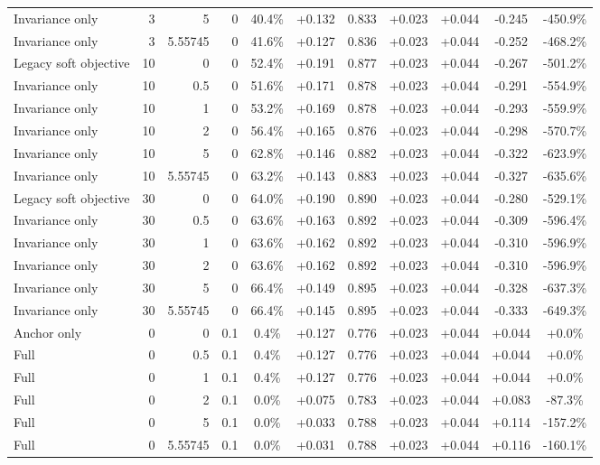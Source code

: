 \begin{table}[htbp]
\begin{tabular}{lrrrccccccc}
Invariance only & 3 & 5 & 0 & 40.4\% & +0.132 & 0.833 & +0.023 & +0.044 & -0.245 & -450.9\% \\
Invariance only & 3 & 5.55745 & 0 & 41.6\% & +0.127 & 0.836 & +0.023 & +0.044 & -0.252 & -468.2\% \\
Legacy soft objective & 10 & 0 & 0 & 52.4\% & +0.191 & 0.877 & +0.023 & +0.044 & -0.267 & -501.2\% \\
Invariance only & 10 & 0.5 & 0 & 51.6\% & +0.171 & 0.878 & +0.023 & +0.044 & -0.291 & -554.9\% \\
Invariance only & 10 & 1 & 0 & 53.2\% & +0.169 & 0.878 & +0.023 & +0.044 & -0.293 & -559.9\% \\
Invariance only & 10 & 2 & 0 & 56.4\% & +0.165 & 0.876 & +0.023 & +0.044 & -0.298 & -570.7\% \\
Invariance only & 10 & 5 & 0 & 62.8\% & +0.146 & 0.882 & +0.023 & +0.044 & -0.322 & -623.9\% \\
Invariance only & 10 & 5.55745 & 0 & 63.2\% & +0.143 & 0.883 & +0.023 & +0.044 & -0.327 & -635.6\% \\
Legacy soft objective & 30 & 0 & 0 & 64.0\% & +0.190 & 0.890 & +0.023 & +0.044 & -0.280 & -529.1\% \\
Invariance only & 30 & 0.5 & 0 & 63.6\% & +0.163 & 0.892 & +0.023 & +0.044 & -0.309 & -596.4\% \\
Invariance only & 30 & 1 & 0 & 63.6\% & +0.162 & 0.892 & +0.023 & +0.044 & -0.310 & -596.9\% \\
Invariance only & 30 & 2 & 0 & 63.6\% & +0.162 & 0.892 & +0.023 & +0.044 & -0.310 & -596.9\% \\
Invariance only & 30 & 5 & 0 & 66.4\% & +0.149 & 0.895 & +0.023 & +0.044 & -0.328 & -637.3\% \\
Invariance only & 30 & 5.55745 & 0 & 66.4\% & +0.145 & 0.895 & +0.023 & +0.044 & -0.333 & -649.3\% \\
Anchor only & 0 & 0 & 0.1 & 0.4\% & +0.127 & 0.776 & +0.023 & +0.044 & +0.044 & +0.0\% \\
Full & 0 & 0.5 & 0.1 & 0.4\% & +0.127 & 0.776 & +0.023 & +0.044 & +0.044 & +0.0\% \\
Full & 0 & 1 & 0.1 & 0.4\% & +0.127 & 0.776 & +0.023 & +0.044 & +0.044 & +0.0\% \\
Full & 0 & 2 & 0.1 & 0.0\% & +0.075 & 0.783 & +0.023 & +0.044 & +0.083 & -87.3\% \\
Full & 0 & 5 & 0.1 & 0.0\% & +0.033 & 0.788 & +0.023 & +0.044 & +0.114 & -157.2\% \\
Full & 0 & 5.55745 & 0.1 & 0.0\% & +0.031 & 0.788 & +0.023 & +0.044 & +0.116 & -160.1\% \\

\end{tabular}
\end{table}
